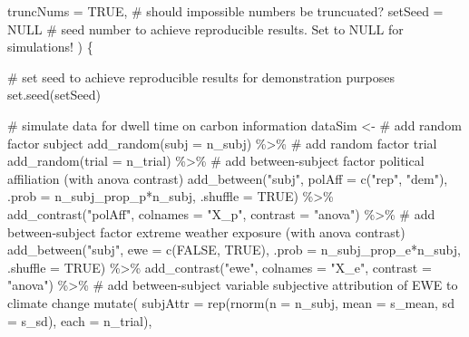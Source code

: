\documentclass[
  letterpaper,
  DIV=11,
  numbers=noendperiod]{scrartcl}
\newenvironment{Shaded}{\begin{snugshade}}{\end{snugshade}}
\newcommand{\AttributeTok}[1]{\textcolor[rgb]{0.40,0.45,0.13}{#1}}
\newcommand{\CommentTok}[1]{\textcolor[rgb]{0.37,0.37,0.37}{#1}}
\newcommand{\ConstantTok}[1]{\textcolor[rgb]{0.56,0.35,0.01}{#1}}
\newcommand{\FunctionTok}[1]{\textcolor[rgb]{0.28,0.35,0.67}{#1}}
\newcommand{\NormalTok}[1]{\textcolor[rgb]{0.00,0.23,0.31}{#1}}
\newcommand{\OtherTok}[1]{\textcolor[rgb]{0.00,0.23,0.31}{#1}}
\newcommand{\SpecialCharTok}[1]{\textcolor[rgb]{0.37,0.37,0.37}{#1}}
\newcommand{\StringTok}[1]{\textcolor[rgb]{0.13,0.47,0.30}{#1}}
\begin{document}
\begin{Shaded}
\begin{Highlighting}[]
  \AttributeTok{truncNums      =}                \ConstantTok{TRUE}\NormalTok{, }\CommentTok{\# should impossible numbers be truncuated?}
  \AttributeTok{setSeed        =}                \ConstantTok{NULL}  \CommentTok{\# seed number to achieve reproducible results. Set to NULL for simulations!}
\NormalTok{) \{}
  
  \CommentTok{\# set seed to achieve reproducible results for demonstration purposes}
  \FunctionTok{set.seed}\NormalTok{(setSeed)}
  
  \CommentTok{\# simulate data for dwell time on carbon information}
\NormalTok{  dataSim }\OtherTok{\textless{}{-}} 
    \CommentTok{\# add random factor subject}
    \FunctionTok{add\_random}\NormalTok{(}\AttributeTok{subj =}\NormalTok{ n\_subj) }\SpecialCharTok{\%\textgreater{}\%} 
    \CommentTok{\# add random factor trial}
    \FunctionTok{add\_random}\NormalTok{(}\AttributeTok{trial =}\NormalTok{ n\_trial) }\SpecialCharTok{\%\textgreater{}\%} 
    \CommentTok{\# add between{-}subject factor political affiliation (with anova contrast)}
    \FunctionTok{add\_between}\NormalTok{(}\StringTok{"subj"}\NormalTok{, }\AttributeTok{polAff =} \FunctionTok{c}\NormalTok{(}\StringTok{"rep"}\NormalTok{, }\StringTok{"dem"}\NormalTok{), }\AttributeTok{.prob =}\NormalTok{ n\_subj\_prop\_p}\SpecialCharTok{*}\NormalTok{n\_subj, }\AttributeTok{.shuffle =} \ConstantTok{TRUE}\NormalTok{) }\SpecialCharTok{\%\textgreater{}\%} 
    \FunctionTok{add\_contrast}\NormalTok{(}\StringTok{"polAff"}\NormalTok{, }\AttributeTok{colnames =} \StringTok{"X\_p"}\NormalTok{, }\AttributeTok{contrast =} \StringTok{"anova"}\NormalTok{) }\SpecialCharTok{\%\textgreater{}\%} 
    \CommentTok{\# add between{-}subject factor extreme weather exposure (with anova contrast)}
    \FunctionTok{add\_between}\NormalTok{(}\StringTok{"subj"}\NormalTok{, }\AttributeTok{ewe =} \FunctionTok{c}\NormalTok{(}\ConstantTok{FALSE}\NormalTok{, }\ConstantTok{TRUE}\NormalTok{), }\AttributeTok{.prob =}\NormalTok{ n\_subj\_prop\_e}\SpecialCharTok{*}\NormalTok{n\_subj, }\AttributeTok{.shuffle =} \ConstantTok{TRUE}\NormalTok{) }\SpecialCharTok{\%\textgreater{}\%} 
    \FunctionTok{add\_contrast}\NormalTok{(}\StringTok{"ewe"}\NormalTok{, }\AttributeTok{colnames =} \StringTok{"X\_e"}\NormalTok{, }\AttributeTok{contrast =} \StringTok{"anova"}\NormalTok{) }\SpecialCharTok{\%\textgreater{}\%} 
    \CommentTok{\# add between{-}subject variable subjective attribution of EWE to climate change}
    \FunctionTok{mutate}\NormalTok{(}
      \AttributeTok{subjAttr =} \FunctionTok{rep}\NormalTok{(}\FunctionTok{rnorm}\NormalTok{(}\AttributeTok{n =}\NormalTok{ n\_subj, }\AttributeTok{mean =}\NormalTok{ s\_mean, }\AttributeTok{sd =}\NormalTok{ s\_sd), }\AttributeTok{each =}\NormalTok{ n\_trial),}

\end{Highlighting}
\end{Shaded}
\end{document}

